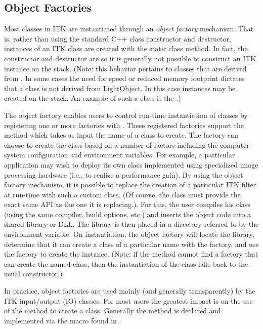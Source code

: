\subsection{Object Factories}
\label{sec:ObjectFactories}


Most classes in ITK are instantiated through an \emph{object factory}
mechanism. That is, rather than using the standard C++ class constructor and
destructor, instances of an ITK class are created with the static class
 method. In fact, the constructor and destructor are
 so it is generally not possible to construct an ITK
instance on the stack. (Note: this behavior pertains to classes that are
derived from . In some cases the need for speed or
reduced memory footprint dictates that a class is not derived from
LightObject. In this case instances may be created on the stack. An
example of such a class is the .)

The object factory enables users to control run-time instantiation of classes
by registering one or more factories with . These
registered factories support the method 
which takes as input the name of a class to create. The factory can choose to
create the class based on a number of factors including the computer system
configuration and environment variables. For example, a particular
application may wish to deploy its own class implemented using
specialized image processing hardware (i.e., to realize a performance
gain). By using the object factory mechanism, it is possible to replace
the creation of a particular ITK filter at run-time with such a custom class.
(Of course, the class must provide the exact same API as the one it is
replacing.). For this, the user compiles his class (using the same compiler,
build options, etc.) and inserts the object code into a shared library or
DLL. The library is then placed in a directory referred to by the
 environment variable. On instantiation, the object
factory will locate the library, determine that it can create a class of a
particular name with the factory, and use the factory to create the
instance. (Note: if the  method cannot find a factory
that can create the named class, then the instantiation of the class falls
back to the usual constructor.)

In practice, object factories are used mainly (and generally transparently) by
the ITK input/output (IO) classes. For most users the greatest impact is on
the use of the  method to create a class. Generally the
 method is declared and implemented via the macro
 found in .


